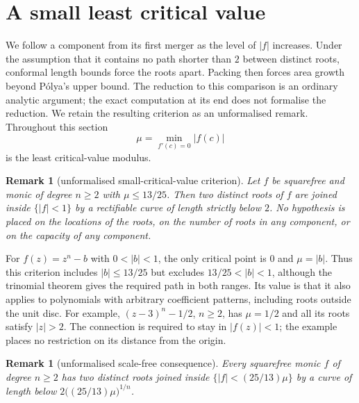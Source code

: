 \documentclass[11pt]{article}
\newtheorem{remark}[theorem]{Remark}
\begin{document}
\section{A small least critical value}
\label{sec:low-critical-closure}


We follow a component from its first merger as the level of $|f|$
increases. Under the assumption that it contains no path shorter than
$2$ between distinct roots, conformal length bounds force the roots
apart. Packing then forces area growth beyond P\'olya's upper bound.
The reduction to this comparison is an ordinary analytic argument;
the exact computation at its end does not formalise the reduction.
We retain the resulting criterion as an unformalised remark.
Throughout this section
\[
 \mu=\min_{f'(c)=0}|f(c)|
\]
is the least critical-value modulus.

\begin{remark}[unformalised small-critical-value criterion]
\label{res:low-critical-thirteen-twentyfifths}
Let $f$ be squarefree and monic of degree $n\ge2$ with $\mu\le13/25$.  Then
two distinct roots of $f$ are joined inside $\{|f|<1\}$ by a rectifiable
curve of length strictly below $2$.  No hypothesis is placed on the locations
of the roots, on the number of roots in any component, or on the capacity of
any component.
\end{remark}


For $f(z)=z^n-b$ with $0<|b|<1$, the only critical point is $0$ and
$\mu=|b|$. Thus this criterion includes $|b|\le13/25$ but excludes
$13/25<|b|<1$, although the trinomial theorem gives the required path
in both ranges. Its value is that it also applies to polynomials with
arbitrary coefficient patterns, including roots outside the unit disc. For example,
$(z-3)^n-1/2$, $n\ge2$, has $\mu=1/2$ and all its roots satisfy
$|z|>2$. The connection is required to stay in $|f(z)|<1$; the example places
no restriction on its distance from the origin.

\begin{remark}[unformalised scale-free consequence]
\label{res:low-critical-scale-free}
Every squarefree monic $f$ of degree $n\ge2$ has two distinct roots joined
inside $\{|f|<(25/13)\mu\}$ by a curve of length below
$2\bigl((25/13)\mu\bigr)^{1/n}$.
\end{remark}
\end{document}

